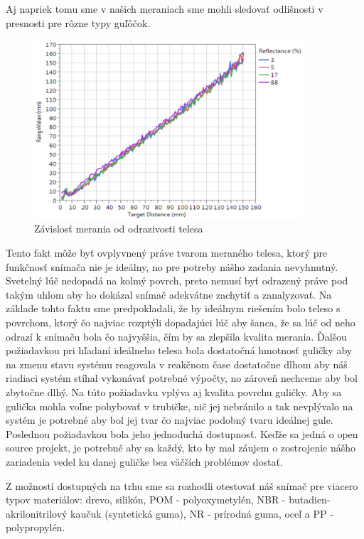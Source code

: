 Aj napriek tomu sme v našich meraniach sme mohli sledovať odlišnosti v presnosti pre rôzne typy guľôčok. 
\begin{figure}[]
	\centering
	\includegraphics[width=100mm]{obr/TOFreflectance.eps}
	\caption{Závislosť merania od odrazivosti telesa\cite{VL6180X}}\label{OBRAZOK 2.3.1} 
\end{figure} 
Tento fakt môže byť ovplyvnený práve tvarom meraného telesa, ktorý pre funkčnosť snímača nie je ideálny, no pre potreby nášho zadania nevyhnutný. Svetelný lúč nedopadá na kolmý povrch, preto nemusí byť odrazený práve pod takým uhlom aby ho dokázal snímač adekvátne zachytiť a zanalyzovať. Na základe tohto faktu sme predpokladali, že by ideálnym riešením bolo teleso s povrchom, ktorý čo najviac rozptýli dopadajúci lúč aby šanca, že sa lúč od neho odrazí k snímaču bola čo najvyššia, čím by sa zlepšila kvalita merania. Ďalšou požiadavkou pri hľadaní ideálneho telesa bola dostatočná hmotnosť guličky aby na zmenu stavu systému reagovala v reakčnom čase dostatočne dlhom aby náš riadiaci systém stíhal vykonávať potrebné výpočty, no zároveň nechceme aby bol zbytočne dlhý. Na túto požiadavku vplýva aj kvalita povrchu guličky. Aby sa gulička mohla voľne pohybovať v trubičke, nič jej nebránilo a tak nevplývalo na systém je potrebné aby bol jej tvar čo najviac podobný tvaru ideálnej gule. Poslednou požiadavkou bola jeho jednoduchá dostupnosť. Keďže sa jedná o open source projekt, je potrebné aby sa každý, kto by mal záujem o zostrojenie nášho zariadenia vedel ku danej guličke bez väčších problémov dostať. 

Z možností dostupných na trhu sme sa rozhodli otestovať náš snímač  pre viacero typov materiálov: 
 drevo, silikón, POM - polyoxymetylén, NBR - butadien-akrilonitrilový kaučuk (syntetická guma), NR - prírodná guma, oceľ a PP - polypropylén.


